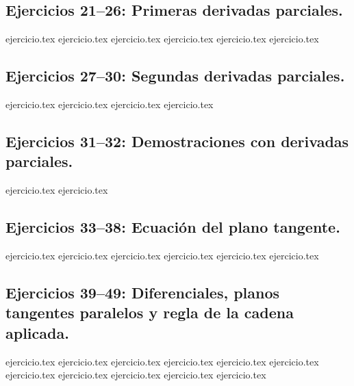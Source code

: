 \subsection*{Ejercicios 21--26: Primeras derivadas parciales.}
\begin{enumerate}
    \setcounter{enumi}{20}
    {ejercicio.tex}
    {ejercicio.tex}
    {ejercicio.tex}
    {ejercicio.tex}
    {ejercicio.tex}
    {ejercicio.tex}
\end{enumerate}

\subsection*{Ejercicios 27--30: Segundas derivadas parciales.}
\begin{enumerate}
    \setcounter{enumi}{26}
    {ejercicio.tex}
    {ejercicio.tex}
    {ejercicio.tex}
    {ejercicio.tex}
\end{enumerate}

\subsection*{Ejercicios 31--32: Demostraciones con derivadas parciales.}
\begin{enumerate}
    \setcounter{enumi}{30}
    {ejercicio.tex}
    {ejercicio.tex}
\end{enumerate}

\subsection*{Ejercicios 33--38: Ecuación del plano tangente.}
\begin{enumerate}
    \setcounter{enumi}{32}
    {ejercicio.tex}
    {ejercicio.tex}
    {ejercicio.tex}
    {ejercicio.tex}
    {ejercicio.tex}
    {ejercicio.tex}
\end{enumerate}

\subsection*{Ejercicios 39--49: Diferenciales, planos tangentes paralelos y regla de la cadena aplicada.}
\begin{enumerate}
    \setcounter{enumi}{38}
    {ejercicio.tex}
    {ejercicio.tex}
    {ejercicio.tex}
    {ejercicio.tex}
    {ejercicio.tex}
    {ejercicio.tex}
    {ejercicio.tex}
    {ejercicio.tex}
    {ejercicio.tex}
    {ejercicio.tex}
    {ejercicio.tex}
\end{enumerate}

